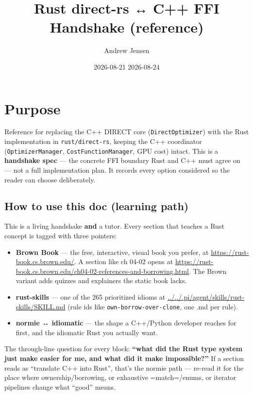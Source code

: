 \documentclass[11pt]{article}
\author{Andrew Jensen}
\date{2026-08-21 2026-08-24}
\title{Rust direct-rs ↔ C++ FFI Handshake (reference)}
\begin{document}
\maketitle

\section{Purpose}
\label{sec:orgf21adce}

Reference for replacing the C++ DIRECT core (\texttt{DirectOptimizer}) with the Rust
implementation in \texttt{rust/direct-rs}, keeping the C++ coordinator
(\texttt{OptimizerManager}, \texttt{CostFunctionManager}, GPU cost) intact. This is a
\textbf{handshake spec} — the concrete FFI boundary Rust and C++ must agree on — not a
full implementation plan. It records every option considered so the reader can
choose deliberately.
\subsection{How to use this doc (learning path)}
\label{sec:orgb153688}

This is a living handshake \textbf{and} a tutor. Every section that teaches a Rust
concept is tagged with three pointers:

\begin{itemize}
\item \textbf{\textbf{Brown Book}} — the free, interactive, visual book you prefer, at
\url{https://rust-book.cs.brown.edu/}. A section like ch 04-02 opens at
\url{https://rust-book.cs.brown.edu/ch04-02-references-and-borrowing.html}.
The Brown variant adds quizzes and explainers the static book lacks.
\item \textbf{\textbf{rust-skills}} — one of the 265 prioritized idioms at
\url{../../.pi/agent/skills/rust-skills/SKILL.md} (rule ids like
\texttt{own-borrow-over-clone}, one .md per rule).
\item \textbf{\textbf{normie ↔ idiomatic}} — the shape a C++/Python developer reaches for first,
and the idiomatic Rust you actually want.
\end{itemize}

The through-line question for every block: \textbf{``what did the Rust type system
just make easier for me, and what did it make impossible?''} If a section
reads as ``translate C++ into Rust'', that's the normie path — re-read it for
the place where ownership/borrowing, or exhaustive =match=/enums, or
iterator pipelines change what ``good'' means.
\end{document}
